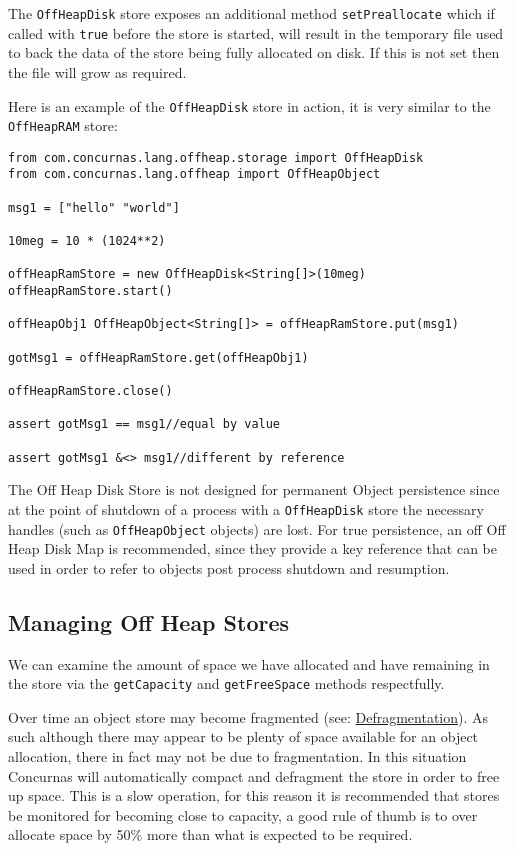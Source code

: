 \documentclass[conc-doc]{subfiles}
\begin{document}
The \lstinline{OffHeapDisk} store exposes an additional method \lstinline{setPreallocate} which if called with \lstinline{true} before the store is started, will result in the temporary file used to back the data of the store being fully allocated on disk. If this is not set then the file will grow as required.

Here is an example of the \lstinline{OffHeapDisk} store in action, it is very similar to the \lstinline{OffHeapRAM} store:

\begin{lstlisting}
from com.concurnas.lang.offheap.storage import OffHeapDisk
from com.concurnas.lang.offheap import OffHeapObject

msg1 = ["hello" "world"]

10meg = 10 * (1024**2)

offHeapRamStore = new OffHeapDisk<String[]>(10meg)
offHeapRamStore.start()

offHeapObj1 OffHeapObject<String[]> = offHeapRamStore.put(msg1)

gotMsg1 = offHeapRamStore.get(offHeapObj1)

offHeapRamStore.close()

assert gotMsg1 == msg1//equal by value

assert gotMsg1 &<> msg1//different by reference
\end{lstlisting}

The Off Heap Disk Store is not designed for permanent Object persistence since at the point of shutdown of a process with a \lstinline{OffHeapDisk} store the necessary handles (such as \lstinline{OffHeapObject} objects) are lost. For true persistence, an off Off Heap Disk Map is recommended, since they provide a key reference that can be used in order to refer to objects post process shutdown and resumption.

\subsection{Managing Off Heap Stores}
We can examine the amount of space we have allocated and have remaining in the store via the \lstinline{getCapacity} and \lstinline{getFreeSpace} methods respectfully.

Over time an object store may become fragmented (see: \href{https://en.wikipedia.org/wiki/Defragmentation}{Defragmentation}). As such although there may appear to be plenty of space available for an object allocation, there in fact may not be due to fragmentation. In this situation Concurnas will automatically compact and defragment the store in order to free up space. This is a slow operation, for this reason it is recommended that stores be monitored for becoming close to capacity, a good rule of thumb is to over allocate space by 50\% more than what is expected to be required.
\end{document}
